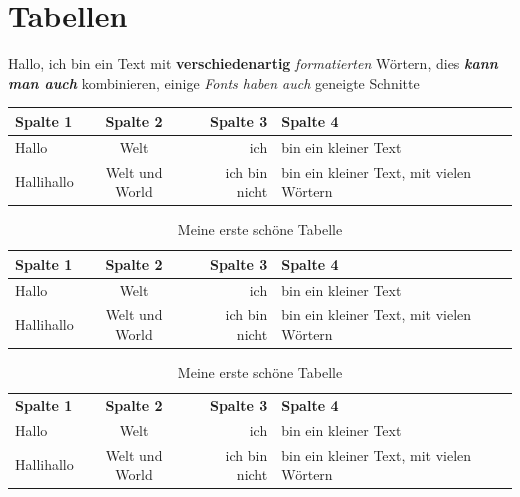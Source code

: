\documentclass[12pt,parskip=half]{scrartcl}
\begin{document}
\blindtext[5]

\section{Tabellen}

Hallo, ich bin ein Text mit \textbf{verschiedenartig} \textit{formatierten}    Wörtern, dies \textbf{\textit{kann man auch}} kombinieren, einige \textsl{Fonts haben auch} geneigte Schnitte

\clearpage

\begin{tabular}{|l|c|r|p{5cm}|} \hline
\textbf{Spalte 1} & \textbf{Spalte 2} & \textbf{Spalte  3} & \textbf{Spalte  4} \\ \hline \hline
Hallo & Welt & ich & bin ein kleiner Text \\ \hline 
Hallihallo & Welt und World & ich bin nicht & bin ein kleiner Text, mit vielen Wörtern \\ \hline
\end{tabular}\vspace*{1cm}

\begin{table}
\caption{Meine erste schöne Tabelle}\label{tab:erste}
\begin{tabular}{lcrp{5cm}} \toprule
\textbf{Spalte 1} & \textbf{Spalte 2} & \textbf{Spalte  3} & \textbf{Spalte  4} \\ \midrule
Hallo & Welt & ich & bin ein kleiner Text \\ 
Hallihallo & Welt und World & ich bin nicht & bin ein kleiner Text, mit vielen Wörtern \\ \bottomrule
\end{tabular}
\end{table}

\begin{table}
\caption{Meine erste schöne Tabelle}\label{tab:zweite}
\begin{tabular}{lcrp{5cm}} \toprule[1.5pt]
\textbf{Spalte 1} & \textbf{Spalte 2} & \textbf{Spalte  3} & \textbf{Spalte  4} \\ \cmidrule[2pt](rl){1-4}
Hallo & Welt & ich & bin ein kleiner Text \\ 
Hallihallo & Welt und World & ich bin nicht & bin ein kleiner Text, mit vielen Wörtern \\ \bottomrule[1.5pt]
\end{tabular}
\end{table}
\end{document}
